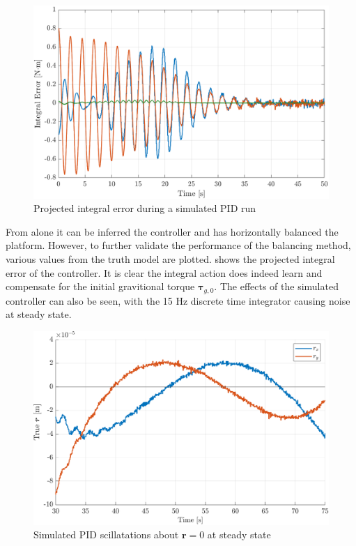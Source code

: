 \begin{figure}[!ht]
    \centering
    \includegraphics[width=0.9\linewidth]{plots/PID_sim_integral_error.png}
    \caption{Projected integral error during a simulated PID run}
    \label{fig:PID_sim_integral_error}
\end{figure}

From  alone it can be inferred the controller and has horizontally balanced the platform. However, to further validate the performance of the balancing method, various values from the truth model are plotted.  shows the projected integral error of the controller. It is clear the integral action does indeed learn and compensate for the initial gravitional torque $\bm{\tau}_{g,0}$. The effects of the simulated controller can also be seen, with the 15 Hz discrete time integrator causing noise at steady state.

\begin{figure}[!ht]
    \centering
    \includegraphics[width=0.9\linewidth]{plots/PID_sim_oscillations.pdf}
    \caption{Simulated PID scillatations about $\bm{r}=0$ at steady state}
    \label{fig:PID_sim_oscillations}
\end{figure}

